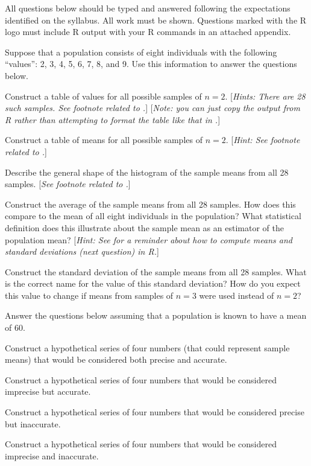 \documentclass[10pt,openany]{book}\usepackage[]{graphicx}\usepackage[]{color}
\begin{document}
\newpage
\begin{hwsection}{All questions below should be typed and answered following the expectations identified on the syllabus.  All work must be shown.  Questions marked with the R logo must include R output with your R commands in an attached appendix.}

  \item \label{hwprob:SamplingDist1} \rhw{} Suppose that a population consists of eight individuals with the following ``values'': 2, 3, 4, 5, 6, 7, 8, and 9.  Use this information to answer the questions below.
    \begin{Enumerate}
      \item Construct a table of values for all possible samples of $n=2$.  [\textit{Hints: There are 28 such samples.  See footnote related to .}]  [\textit{Note: you can just copy the output from R rather than attempting to format the table like that in .}]
      \item Construct a table of means for all possible samples of $n=2$.  [\textit{Hint: See footnote related to .}]
      \item Describe the general shape of the histogram of the sample means from all 28 samples.  [\textit{See footnote related to .}]
      \item Construct the average of the sample means from all 28 samples.  How does this compare to the mean of all eight individuals in the population?  What statistical definition does this illustrate about the sample mean as an estimator of the population mean? [\textit{Hint: See  for a reminder about how to compute means and standard deviations (next question) in R.}]
      \item Construct the standard deviation of the sample means from all 28 samples.  What is the correct name for the value of this standard deviation?  How do you expect this value to change if means from samples of $n=3$ were used instead of $n=2$?
    \end{Enumerate}
  \item \label{hwprob:SamplingDistPA} Answer the questions below assuming that a population is known to have a mean of 60.
    \begin{Enumerate}
      \item Construct a hypothetical series of four numbers (that could represent sample means) that would be considered both precise and accurate.
      \item Construct a hypothetical series of four numbers that would be considered imprecise but accurate.
      \item Construct a hypothetical series of four numbers that would be considered precise but inaccurate.
      \item Construct a hypothetical series of four numbers that would be considered imprecise and inaccurate.
    \end{Enumerate}


\end{hwsection}
\end{document}
